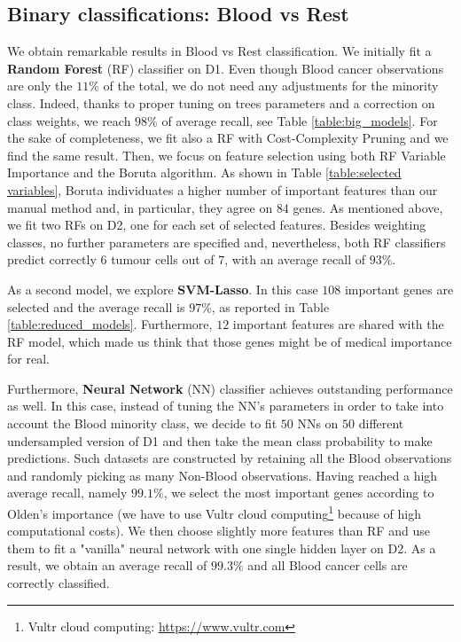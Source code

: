 \documentclass[a4paper,11pt, oneside]{article}  %
\begin{document}
\subsection{Binary classifications: Blood vs Rest}
We obtain remarkable results in Blood vs Rest classification. We initially fit a \textbf{Random Forest} (RF) classifier on D1. Even though Blood cancer observations are only the $11\%$ of the total,  we do not need any adjustments for the minority class.  Indeed, thanks to proper tuning on trees parameters and a correction on class weights, we reach $98\%$ of average recall,  see Table \ref{table:big_models}. For the sake of completeness, we fit also a RF with Cost-Complexity Pruning and we find the same result. Then,  we focus on feature selection using both RF Variable Importance and the Boruta algorithm. As shown in Table \ref{table:selected variables},  Boruta individuates a higher number of important features than our manual method and,  in particular,  they agree on $84$ genes. As mentioned above,  we fit two RFs on D2, one for each set of selected features. Besides weighting classes, no further parameters are specified and, nevertheless, both RF classifiers predict correctly $6$ tumour cells out of $7$,  with an average recall of $93\%$.

As a second model, we explore \textbf{SVM-Lasso}. In this case $108$ important genes are selected and the average recall is $97\%$, as reported in Table \ref{table:reduced_models}. Furthermore, $12$ important features are shared with the RF model, which made us think that those genes might be of medical importance for real.

Furthermore, \textbf{Neural Network} (NN) classifier achieves outstanding performance as well.  In this case,  instead of tuning the NN's parameters in order to take into account the Blood minority class,  we decide to fit $50$ NNs on $50$ different undersampled version of D1 and then take the mean class probability to make predictions. Such datasets are constructed by retaining all the Blood observations and randomly picking as many Non-Blood observations.  Having reached a high average recall, namely $99.1\%$,  we select the most important genes according to Olden's importance (we have to use Vultr cloud computing\footnote{Vultr cloud computing: \url{https://www.vultr.com}} because of high computational costs).  We then choose slightly more features than RF and  use them to fit a "vanilla" neural network with one single hidden layer on D2.  As a result, we obtain an average recall of $99.3\%$ and all Blood cancer cells are correctly classified. 
\end{document}

